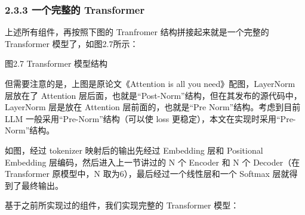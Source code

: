 \documentclass[12pt,a4paper]{book}
\begin{document}
\subsubsection{2.3.3 一个完整的
Transformer}\label{ux4e00ux4e2aux5b8cux6574ux7684-transformer}

上述所有组件，再按照下图的 Tranfromer 结构拼接起来就是一个完整的
Transformer 模型了，如图2.7所示：

图2.7 Transformer 模型结构

但需要注意的是，上图是原论文《Attention is all you need》配图，LayerNorm
层放在了 Attention
层后面，也就是``Post-Norm''结构，但在其发布的源代码中，LayerNorm
层是放在 Attention 层前面的，也就是``Pre Norm''结构。考虑到目前 LLM
一般采用``Pre-Norm''结构（可以使 loss
更稳定），本文在实现时采用``Pre-Norm''结构。

如图，经过 tokenizer 映射后的输出先经过 Embedding 层和 Positional
Embedding 层编码，然后进入上一节讲过的 N 个 Encoder 和 N 个 Decoder（在
Transformer 原模型中，N 取为6），最后经过一个线性层和一个 Softmax
层就得到了最终输出。

基于之前所实现过的组件，我们实现完整的 Transformer 模型：
\end{document}
